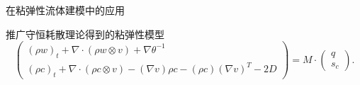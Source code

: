 \documentclass[mathserif]{beamer}
\begin{document}
\begin{frame}{在粘弹性流体建模中的应用}
{	\begin{block}{推广守恒耗散理论得到的粘弹性模型}
	\begin{equation*}
	\left( \begin{array}{c} 
			(\rho w)_t +  \nabla \cdot (\rho w \otimes v)  + \nabla \theta^{-1} \\
			(\rho c)_t +  \nabla \cdot (\rho c \otimes v) - (\nabla v) \rho c - (\rho c) (\nabla v)^T - 2 D 
		\end{array} \right) = M \cdot
		\left( \begin{array}{c} 
			q \\ s_c
		\end{array}\right).	
	\end{equation*}
	\end{block}}
\end{frame}
\end{document}
